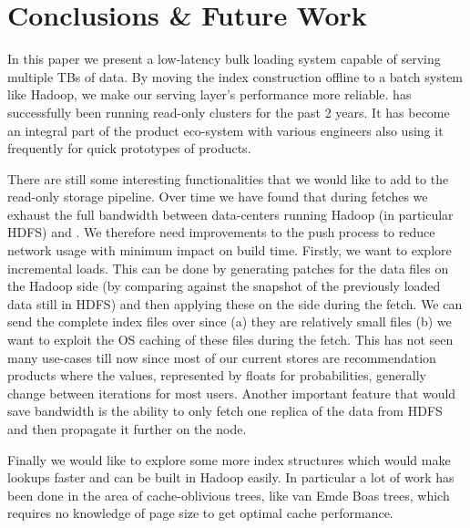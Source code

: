 \section{Conclusions \& Future Work}
\label{sec:conclusion}

In this paper we present a low-latency bulk loading system capable of serving multiple TBs of data. By moving the index construction offline to a batch system like Hadoop, we make our serving layer's performance more reliable. \linkedin{} has successfully been running read-only \projectname{} clusters for the past 2 years. It has become an integral part of the product eco-system with various engineers also using it frequently for quick prototypes of products. 

There are still some interesting functionalities that we would like to add to the read-only storage pipeline. Over time we have found that during fetches we exhaust the full bandwidth between data-centers running Hadoop (in particular HDFS) and \projectname{}. We therefore need improvements to the push process to reduce network usage with minimum impact on build time. Firstly, we want to explore incremental loads. This can be done by generating patches for the data files on the Hadoop side (by comparing against the snapshot of the previously loaded data still in HDFS) and then applying these on the \projectname{} side during the fetch. We can send the complete index files over since (a) they are relatively small files (b) we want to exploit the OS caching of these files during the fetch. This has not seen many use-cases till now since most of our current stores are recommendation products where the values, represented by floats for probabilities, generally change between iterations for most users. Another important feature that would save bandwidth is the ability to only fetch one replica of the data from HDFS and then propagate it further on the \projectname{} node. 

Finally we would like to explore some more index structures which would make lookups faster and can be built in Hadoop easily. In particular a lot of work has been done in the area of cache-oblivious trees, like van Emde Boas trees, which requires no knowledge of page size to get optimal cache performance. 
